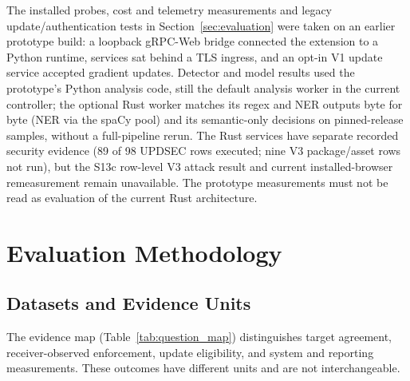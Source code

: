 \documentclass[sigconf]{acmart}
\theoremstyle{acmdefinition}\newtheorem{property}{Property}
\begin{document}
The installed probes, cost and telemetry measurements and legacy update/authentication tests in Section~\ref{sec:evaluation} were taken on an earlier prototype build: a loopback gRPC-Web bridge connected the extension to a Python runtime, services sat behind a TLS ingress, and an opt-in V1 update service accepted gradient updates. Detector and model results used the prototype's Python analysis code, still the default analysis worker in the current controller; the optional Rust worker matches its regex and NER outputs byte for byte (NER via the spaCy pool) and its semantic-only decisions on pinned-release samples, without a full-pipeline rerun. The Rust services have separate recorded security evidence (89 of 98 UPDSEC rows executed; nine V3 package/asset rows not run), but the S13c row-level V3 attack result and current installed-browser remeasurement remain unavailable. The prototype measurements must not be read as evaluation of the current Rust architecture.

\section{Evaluation Methodology}
\label{sec:methodology}
\subsection{Datasets and Evidence Units}
The evidence map (Table~\ref{tab:question_map}) distinguishes target agreement, receiver-observed enforcement, update eligibility, and system and reporting measurements. These outcomes have different units and are not interchangeable.
\end{document}
